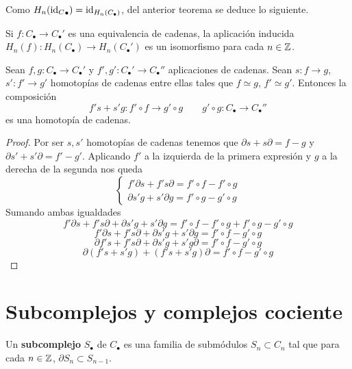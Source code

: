 Como $H_n({\operatorname{id}_C}_{\bullet}) = \operatorname{id}_{H_n(C_{\bullet})}$, del anterior teorema se deduce lo siguiente.

\begin{corolario}
	\label{cor:equiv-homot}
	Si $f: C_{\bullet} \rightarrow C_{\bullet}'$ es una equivalencia de cadenas, la aplicación inducida $H_n(f): H_n(C_{\bullet}) \rightarrow H_n(C_{\bullet}')$ es un isomorfismo para cada $n \in \mathbb{Z}$.
\end{corolario}

\begin{proposicion}
	Sean $f,g: C_{\bullet} \rightarrow C_{\bullet}'$ y $f',g': C_{\bullet}' \rightarrow C_{\bullet}''$ aplicaciones de cadenas. Sean $s: f \rightarrow g$, $s': f' \rightarrow g'$ homotopías de cadenas entre ellas tales que $f \simeq g$, $f' \simeq g'$. Entonces la composición
	\[ f' s + s' g: f' \circ f \rightarrow g' \circ g \qquad g' \circ g : C_{\bullet} \rightarrow C_{\bullet}'' \]
	es una homotopía de cadenas.
\end{proposicion}
\begin{proof}
	Por ser $s,s'$ homotopías de cadenas tenemos que $\partial s + s\partial = f-g$ y $\partial s' + s'\partial = f'-g'$. Aplicando  $f'$ a la izquierda de la primera expresión y $g$ a la derecha de la segunda nos queda
	\begin{equation}
		\begin{cases}
			 f'\partial s + f's\partial = f' \circ f-f' \circ g \\
			 \partial s' g + s'\partial g = f' \circ g-g' \circ g 
		\end{cases}
	\end{equation}
	Sumando ambas igualdades
	\[ f'\partial s + f's\partial + \partial s' g + s'\partial g = f' \circ f-f' \circ g + f' \circ g-g' \circ g \]
	\[ f'\partial s + f's\partial + \partial s' g + s'\partial g = f' \circ f - g' \circ g \]
	\[ \partial f' s + f's \partial + \partial s' g + s' g \partial = f' \circ f - g' \circ g \]
	\[ \partial (f' s + s' g) + (f's + s' g) \partial = f' \circ f - g' \circ g \]
\end{proof}

\section{Subcomplejos y complejos cociente}

\begin{definicion}
	Un \textbf{subcomplejo} $S_{\bullet}$ de $C_{\bullet}$ es una familia de submódulos $S_n \subset C_n$ tal que para cada $n \in \mathbb{Z}$, $\partial S_n \subset S_{n-1}$.
\end{definicion}

